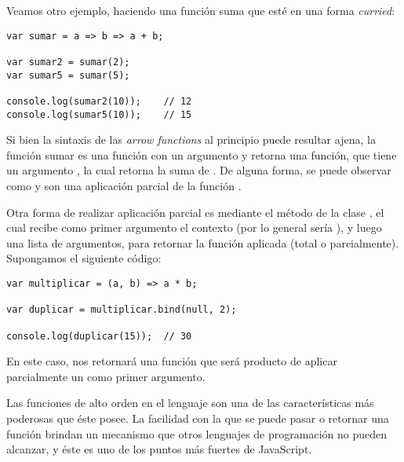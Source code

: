 Veamos otro ejemplo, haciendo una función suma que esté en una forma \textit{curried}:

\begin{lstlisting}[title={Función suma \textit{curried}}]
var sumar = a => b => a + b;

var sumar2 = sumar(2);
var sumar5 = sumar(5);

console.log(sumar2(10));	// 12
console.log(sumar5(10));	// 15
\end{lstlisting}

Si bien la sintaxis de las \textit{arrow functions} al principio puede resultar ajena, la función sumar es una función con un argumento  y retorna una función, que tiene un argumento , la cual retorna la suma de . De alguna forma, se puede observar como  y  son una aplicación parcial de la función .

Otra forma de realizar aplicación parcial es mediante el método  de la clase , el cual recibe como primer argumento el contexto (por lo general sería ), y luego una lista de argumentos, para retornar la función aplicada (total o parcialmente). Supongamos el siguiente código:

\begin{lstlisting}[title={Aplicación parcial usando \code{bind}}]
var multiplicar = (a, b) => a * b;

var duplicar = multiplicar.bind(null, 2);

console.log(duplicar(15));	// 30
\end{lstlisting}

En este caso,  nos retornará una función que será producto de aplicar parcialmente un  como primer argumento. 

Las funciones de alto orden en el lenguaje son una de las características más poderosas que éste posee. La facilidad con la que se puede pasar o retornar una función brindan un mecanismo que otros lenguajes de programación no pueden alcanzar, y éste es uno de los puntos más fuertes de JavaScript.

